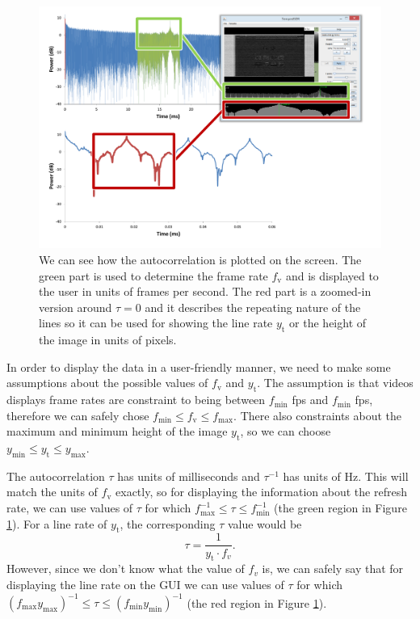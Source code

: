 \documentclass[a4paper,12pt,twoside,openright]{report}
\begin{document}
\begin{figure}[h]
\centering
\includegraphics[width=1\textwidth]{autocorr_compare}
\caption{We can see how the autocorrelation is plotted on the screen. The green part is used to determine the frame rate $f_\text{v}$ and is displayed to the user in units of frames per second. The red part is a zoomed-in version around $\tau = 0$ and it describes the repeating nature of the lines so it can be used for showing the line rate $y_\text{t}$ or the height of the image in units of pixels.}
\label{fig:autocorr_gui}
\end{figure}

In order to display the data in a user-friendly manner, we need to make some assumptions about the possible values of $f_\text{v}$ and $y_\text{t}$. The assumption is that videos displays frame rates are constraint to being between $f_\text{min}$ fps and $f_\text{min}$ fps, therefore we can safely chose $f_\text{min} \leq f_\text{v} \leq f_\text{max}$. There also constraints about the maximum and minimum height of the image $y_\text{t}$, so we can choose $y_\text{min} \leq y_\text{t} \leq y_\text{max}$.

The autocorrelation $\tau$ has units of milliseconds and $\tau^{-1}$ has units of Hz. This will match the units of $f_\text{v}$ exactly, so for displaying the information about the refresh rate, we can use values of $\tau$ for which $f^{-1}_\text{max} \leq \tau \leq f^{-1}_\text{min}$ (the green region in Figure \ref{fig:autocorr_gui}). For a line rate of $y_\text{t}$, the corresponding $\tau$ value would be
$$ \tau = \frac{1}{y_\text{t} \cdot f_{v}} .$$
However, since we don't know what the value of $f_{v}$ is, we can safely say that for displaying the line rate on the GUI we can use values of $\tau$ for which $\left( f_\text{max} y_\text{max} \right)^{-1} \leq \tau \leq \left( f_\text{min} y_\text{min} \right)^{-1}$ (the red region in Figure \ref{fig:autocorr_gui}). 
\end{document}
